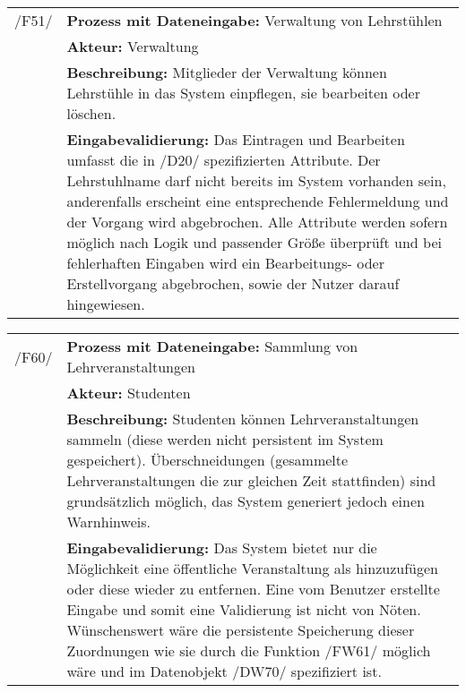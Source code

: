 \begin{tabular}{p{1.5cm}p{14.5cm}}
					
	 /F51/	& \textbf{Prozess mit Dateneingabe:} Verwaltung von Lehrstühlen \\
				& \textbf{Akteur:} Verwaltung \\
				& \textbf{Beschreibung:} Mitglieder der Verwaltung können Lehrstühle in das System einpflegen, sie bearbeiten oder löschen. \\
				& \textbf{Eingabevalidierung:} Das Eintragen und Bearbeiten umfasst die in /D20/ spezifizierten Attribute. Der Lehrstuhlname darf nicht bereits im System vorhanden sein, anderenfalls erscheint eine entsprechende Fehlermeldung und der Vorgang wird abgebrochen. Alle Attribute werden sofern möglich nach Logik und passender Größe überprüft und bei fehlerhaften Eingaben wird ein Bearbeitungs- oder Erstellvorgang abgebrochen, sowie der Nutzer darauf hingewiesen.\\[0.25cm]

\end{tabular}


\begin{tabular}{p{1.5cm}p{14.5cm}}

	 /F60/	& \textbf{Prozess mit Dateneingabe:} Sammlung von Lehrveranstaltungen \\
				& \textbf{Akteur:} Studenten \\
				& \textbf{Beschreibung:} Studenten können Lehrveranstaltungen sammeln (diese werden nicht persistent im System gespeichert). Überschneidungen (gesammelte Lehrveranstaltungen die zur gleichen Zeit stattfinden) sind grundsätzlich möglich, das System generiert jedoch einen Warnhinweis. \\
				& \textbf{Eingabevalidierung:} Das System bietet nur die Möglichkeit eine öffentliche Veranstaltung als hinzuzufügen oder diese wieder zu entfernen. Eine vom Benutzer erstellte Eingabe und somit eine Validierung ist nicht von Nöten. Wünschenswert wäre die persistente Speicherung dieser Zuordnungen wie sie durch die Funktion /FW61/ möglich wäre und im Datenobjekt /DW70/ spezifiziert ist.\\[0.25cm]

\end{tabular}


